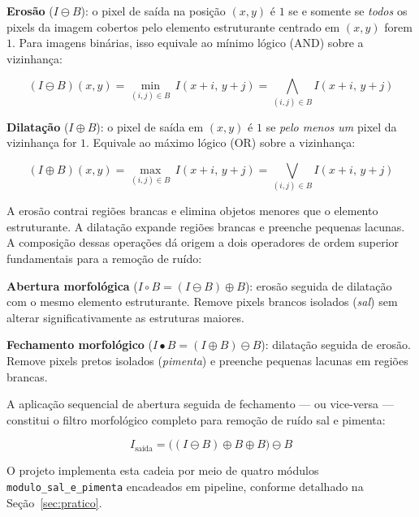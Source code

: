 \documentclass[12pt, a4paper]{article}
\begin{document}
	\textbf{Erosão} ($I \ominus B$): o pixel de saída na posição $(x, y)$ é $1$ se
	e somente se \textit{todos} os pixels da imagem cobertos pelo elemento estruturante
	centrado em $(x, y)$ forem $1$. Para imagens binárias, isso equivale ao mínimo
	lógico (AND) sobre a vizinhança:
	
	\begin{equation}
		(I \ominus B)(x,y) = \min_{(i,j)\in B}\, I(x+i,\, y+j)
		= \bigwedge_{(i,j)\in B} I(x+i,\, y+j)
		\label{eq:erosao}
	\end{equation}
	
	\textbf{Dilatação} ($I \oplus B$): o pixel de saída em $(x, y)$ é $1$ se
	\textit{pelo menos um} pixel da vizinhança for $1$. Equivale ao máximo lógico
	(OR) sobre a vizinhança:
	
	\begin{equation}
		(I \oplus B)(x,y) = \max_{(i,j)\in B}\, I(x+i,\, y+j)
		= \bigvee_{(i,j)\in B} I(x+i,\, y+j)
		\label{eq:dilatacao}
	\end{equation}
	
	A erosão contrai regiões brancas e elimina objetos menores que o elemento
	estruturante. A dilatação expande regiões brancas e preenche pequenas lacunas.
	A composição dessas operações dá origem a dois operadores de ordem superior
	fundamentais para a remoção de ruído:
	
	\textbf{Abertura morfológica} ($I \circ B = (I \ominus B) \oplus B$): erosão
	seguida de dilatação com o mesmo elemento estruturante. Remove pixels brancos
	isolados (\textit{sal}) sem alterar significativamente as estruturas maiores.
	
	\textbf{Fechamento morfológico} ($I \bullet B = (I \oplus B) \ominus B$):
	dilatação seguida de erosão. Remove pixels pretos isolados (\textit{pimenta})
	e preenche pequenas lacunas em regiões brancas.
	
	A aplicação sequencial de abertura seguida de fechamento --- ou vice-versa ---
	constitui o filtro morfológico completo para remoção de ruído sal e pimenta:
	
	\begin{equation}
		I_{\text{saída}} = \bigl((I \ominus B) \oplus B \oplus B\bigr) \ominus B
		\label{eq:abertura_fechamento}
	\end{equation}
	
	\noindent O projeto implementa esta cadeia por meio de quatro módulos
	\texttt{modulo\_sal\_e\_pimenta} encadeados em pipeline, conforme detalhado
	na Seção~\ref{sec:pratico}.
	
\end{document}

